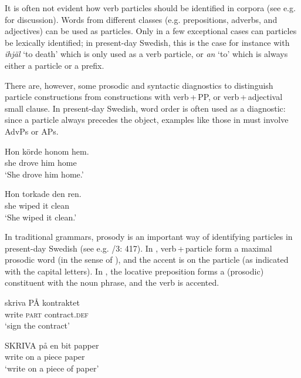 \documentclass[output=paper]{langscibook}
\begin{document}
It is often not evident how verb particles should be identified in corpora (see e.g. \citealt{LarssonRoxendal2020} for discussion). Words from different classes (e.g. prepositions, adverbs, and adjectives) can be used as particles. Only in a few exceptional cases can particles be lexically identified; in present-day Swedish, this is the case for instance with \textit{ihjäl} ‘to death’ which is only used as a verb particle, or \textit{an} ‘to’ which is always either a particle or a prefix.


\begin{sloppypar}
There are, however, some prosodic and syntactic diagnostics to distinguish particle constructions from constructions with verb\,+\,PP, or verb\,+\,adjectival small clause. In present-day Swedish, word order is often used as a diagnostic: since a particle always precedes the object, examples like those in  must involve AdvPs or APs.
\end{sloppypar}


\ea\label{ex:lalu:9}
\ea
\gll  Hon   körde   honom   hem.  \\
    she     drove   him     home\\
\glt `She drove him home.'

\ex
\gll  Hon   torkade   den   ren.\\
    she     wiped   it     clean\\
\glt `She wiped it clean.'
\z
\z

\begin{sloppypar}
In traditional grammars, prosody is an important way of identifying particles in present-day Swedish (see e.g. \citealt{TelemanEtAl1999}/3: 417). In , verb\,+\,particle form a maximal prosodic word (in the sense of \citealt{MyrbergRiad2015}), and the accent is on the particle (as indicated with the capital letters). In , the locative preposition forms a (prosodic) constituent with the noun phrase, and the verb is accented.
\end{sloppypar}

\ea\label{ex:lalu:10}
\ea\label{ex:lalu:10a}
\gll  skriva   PÅ   kontraktet\\
    write     \textsc{part}   contract\textsc{.def}\\
\glt `sign the contract'

\ex\label{ex:lalu:10b}
\gll  SKRIVA  på   en  bit     papper \\
    write     on   a   piece    paper\\
\glt `write on a piece of paper'
\z
\z
\end{document}
